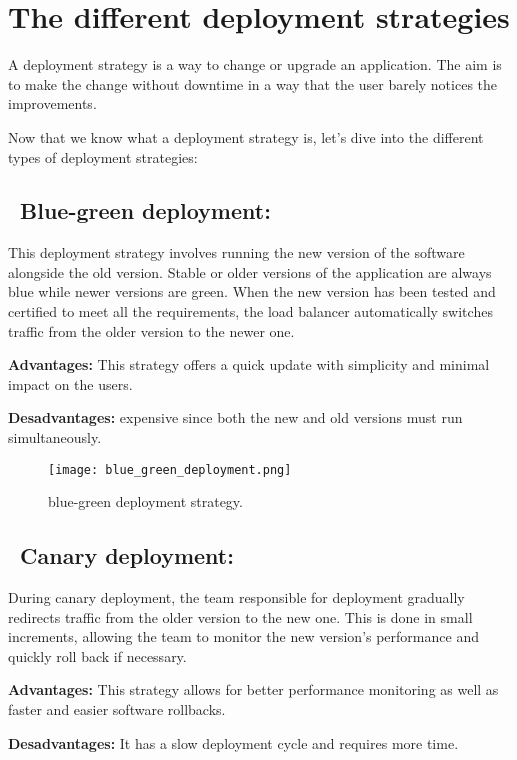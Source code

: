 \section{The different deployment strategies \cite{webArticle6}}
A deployment strategy is a way to change or upgrade an application. The aim is to make the change without downtime in a way that the user barely notices the improvements.
\par Now that we know what a deployment strategy is, let's dive into the different types of deployment strategies:

\subsection*{ \textbullet\ Blue-green deployment:}
This deployment strategy involves running the new version of the software alongside the old version.
Stable or older versions of the application are always blue while newer versions are green.
When the new version has been tested and certified to meet all the requirements, the load balancer automatically switches traffic from the older version to the newer one.
\par \noindent \textbf{Advantages:} This strategy offers a quick update with simplicity and minimal impact on the users.
\par \noindent \textbf{Desadvantages:} expensive since both the new and old versions must run simultaneously.

\begin{figure}[htbp]
    \centering
    \texttt{[image: blue\_green\_deployment.png]}
    \caption{blue-green deployment strategy.}
    \label{fig:blue-green-deployment-strategy}
\end{figure}

\subsection*{ \textbullet\ Canary deployment:}
During canary deployment, the team responsible for deployment gradually redirects traffic from the older version to the new one.
This is done in small increments, allowing the team to monitor the new version's performance and quickly roll back if necessary.
\par \noindent \textbf{Advantages:} This strategy allows for better performance monitoring as well as faster and easier software rollbacks.
\par \noindent \textbf{Desadvantages:} It has a slow deployment cycle and requires more time.

